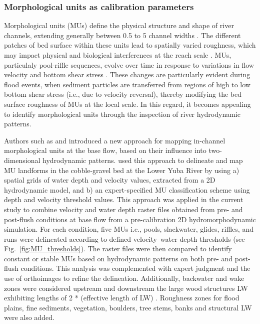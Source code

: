 \documentclass[draft,linenumbers,onecolumn]{agujournal2019} %
\begin{document}
\subsubsection{Morphological units as calibration parameters}
\label{subsec:Sec2.5.1}
Morphological units (MUs) define the physical structure and shape of river channels, extending generally between 0.5 to 5 channel widths \cite{woodworth2022are}. The different patches of bed surface within these units lead to spatially varied roughness, which may impact physical and biological interferences at the reach scale \cite{buffington1999effects,dietrich2005sediment}. MUs, particulaly pool-riffle sequences, evolve over time in response to variations in flow velocity and bottom shear stress \cite{salmela2020morphological, pasternack2017flooddriven,cao2003flow}. These changes are particularly evident during flood events, when sediment particles are transferred from regions of high to low bottom shear stress (i.e., due to velocity reversal), thereby modifying the bed surface roughness of MUs at the local scale. In this regard, it becomes appealing to identify morphological units through the inspection of river hydrodynamic patterns. 

Authors such as  and  introduced a new approach for mapping in-channel morphological units at the base flow, based on their influence into two-dimensional hydrodynamic patterns.  used this approach to delineate and map MU landforms in the cobble-gravel bed at the Lower Yuba River by using a) spatial grids of water depth and velocity values, extracted from a 2D hydrodynamic model, and b) an expert-specified MU classification scheme using depth and velocity threshold values. This approach was applied in the current study to combine velocity and water depth raster files obtained from pre- and post-flush conditions at base flow from a pre-calibration 2D hydromorphodynamic simulation. For each condition, five MUs i.e., pools, slackwater, glides, riffles, and runs were delineated according to defined velocity–water depth thresholds (see Fig.~\ref{fig:MU_thresholds}). The raster files were then compared to identify constant or stable MUs based on hydrodynamic patterns on both pre- and post-flush conditions. This analysis was complemented with expert judgment and the use of orthoimages to refine the delineation. Additionally, backwater and wake  zones were considered upstream and downstream the large wood structures LW exhibiting lengths of 2 * (effective length of LW) \cite{scolari2025hydromorphodynamic}. Roughness zones for flood plains, fine sediments, vegetation, boulders, tree stems, banks and structural LW were also added.    
\end{document}
